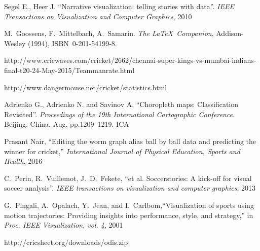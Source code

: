\documentclass[10pt,journal,compsoc]{IEEEtran}
\begin{document}
\begin{thebibliography}{1}

Segel E., Heer J. ``Narrative visualization: telling stories with data''. \emph{IEEE Transactions on Visualization and Computer Graphics}, 2010

M.~Goossens, F.~Mittelbach, A.~Samarin. \emph{The \LaTeX\ Companion},
Addison-Wesley (1994), ISBN~0-201-54199-8.

http://www.cricwaves.com/cricket/2662/chennai-super-kings-vs-mumbai-indians-final-t20-24-May-2015/Teammanrate.html

http://www.dangermouse.net/cricket/statistics.html

Adrienko G., Adrienko N. and Savinov A. ``Choropleth maps: Classification Revisited''. \emph{Proceedings of the 19th International Cartographic Conference}. Beijing, China. Aug. pp.1209–1219. ICA

Prasant Nair, ``Editing the worm graph alias ball by ball data and predicting the winner for cricket,'' \emph{International Journal of Physical Education, Sports and Health}, 2016

C.~Perin, R.~Vuillemot, J.~D.~Fekete, ``et al. Soccerstories: A kick-off for visual soccer analysis''. \emph{IEEE transactions on visualization and computer graphics}, 2013

G.~Pingali, A.~Opalach, Y.~Jean, and I.~Carlbom,``Visualization of sports using motion trajectories: Providing insights into performance, style, and strategy,'' in \emph{Proc. IEEE Visualization, vol. 4}, 2001

http://cricsheet.org/downloads/odis.zip


\end{thebibliography}
\end{document}
